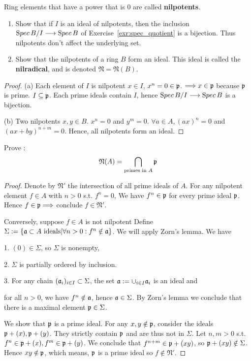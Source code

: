 \documentclass[11pt,fleqn]{book}
\begin{document}
\begin{exr}\label{exr:nilpotents_bijection}
Ring elements that have a power that is $0$ are called \textbf{nilpotents}. 
\begin{enumerate}[label=(\alph*)]
\item 
 Show that if $I$ is an ideal of nilpotents, then the inclusion ${\text Spec\,} B/I \longrightarrow {\text Spec\,} B$ of Exercise~\ref{exr:spec_quotient} is a bijection. Thus nilpotents don’t affect the underlying set. 
\item Show that the nilpotents of a ring $B$ form an ideal. This ideal is called the \textbf{nilradical}, and is denoted $\mathfrak{N} = \mathfrak{N}(B)$.
\end{enumerate}
\end{exr}
\begin{proof}
(a) Each element of $I$ is nilpotent $x\in I$, $x^n=0\in{\mathfrak p}$. $\Longrightarrow x\in{\mathfrak p}$ because ${\mathfrak p}$ is prime. $I\subseteq{\mathfrak p}$. Each prime ideals contain $I$, hence ${\text Spec\,} B/I\longrightarrow {\text Spec\,} B$ is a bijection.

(b) Two nilpotents $x,y\in B$.
$x^n=0$ and $y^m=0$. $\forall a\in A, (ax)^n=0$ and $(ax+by)^{n+m}=0$. Hence, all nilpotents form an ideal.
\end{proof}

\begin{exr}
Prove : 
$$
\mathfrak{N}(A)=\bigcap_{\text{primes in }A}{\mathfrak p}
$$
\end{exr}
\begin{proof}
Denote by $\mathfrak{N}'$ the intersection of all prime ideals of ${A}$.
For any nilpotent element $f\in {A}$ with $n>0$ s.t. $f^n=0$,
We have $f^n\in {\mathfrak p}$ for every prime ideal ${\mathfrak p}$. Hence $f\in {\mathfrak p}\Longrightarrow$ conclude $f\in \mathfrak{N}'$.

Conversely, suppose $f\in {A}$ is not nilpotent 
Define $\Sigma:=\{ {\mathfrak a} \subset A\text{ ideals} | \forall n>0: f^n\notin {\mathfrak a}\}$.
We will apply Zorn's lemma. 
We have 

    1.  $(0)\in \Sigma$, so $\Sigma$ is nonempty,

    2.  $\Sigma$ is partially ordered by inclusion.

    3.  For any chain $({\mathfrak a}_i)_{i\in I}\subset \Sigma$, the set ${\mathfrak a} :=\cup_{i\in I}{\mathfrak a}_i$ is an ideal and 

    for all $n>0$, 
    we have $f^n \notin {\mathfrak a}$, hence ${\mathfrak a} \in \Sigma$.
By Zorn's lemma we conclude that there is a maximal element ${\mathfrak p}\in \Sigma$.

We show that ${\mathfrak p}$ is a prime ideal.
For any $x,y \notin {\mathfrak p}$, consider the ideals
${\mathfrak p}+(x), {\mathfrak p}+(y)$. They strictly contain ${\mathfrak p}$ and are thus not in $\Sigma$.
Let $n,m>0$ s.t. $f^n\in {\mathfrak p}+(x), f^m\in {\mathfrak p}+(y)$.
We conclude that $f^{n+m}\in {\mathfrak p}+(xy)$, so ${\mathfrak p}+(xy) \notin \Sigma$.
Hence $xy \notin {\mathfrak p}$, which means, ${\mathfrak p} $ is a prime ideal so $f \notin \mathfrak{N}'$.
\end{proof}
\end{document}
